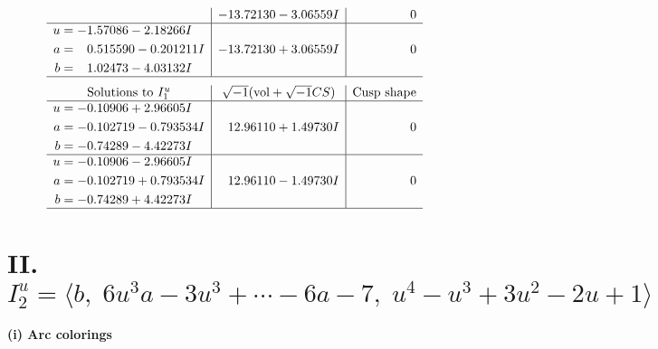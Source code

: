 \documentclass[1p]{elsarticle_modified}
\theoremstyle{definition}
\newcommand{\I}{\sqrt{-1}}
\begin{document}
$$\begin{array}{c|c|c}
 & -13.72130 - 3.06559 I & \phantom{-0.000000 } 0 \\ \hline\begin{aligned}
u &= -1.57086 - 2.18266 I \\
a &= \phantom{-}0.515590 - 0.201211 I \\
b &= \phantom{-}1.02473 - 4.03132 I\end{aligned}
 & -13.72130 + 3.06559 I & \phantom{-0.000000 } 0\\
 \hline 
 \end{array}$$\newpage$$\begin{array}{c|c|c}  
\text{Solutions to }I^u_{1}& \I (\text{vol} + \sqrt{-1}CS) & \text{Cusp shape}\\
 \hline 
\begin{aligned}
u &= -0.10906 + 2.96605 I \\
a &= -0.102719 - 0.793534 I \\
b &= -0.74289 - 4.42273 I\end{aligned}
 & \phantom{-}12.96110 + 1.49730 I & \phantom{-0.000000 } 0 \\ \hline\begin{aligned}
u &= -0.10906 - 2.96605 I \\
a &= -0.102719 + 0.793534 I \\
b &= -0.74289 + 4.42273 I\end{aligned}
 & \phantom{-}12.96110 - 1.49730 I & \phantom{-0.000000 } 0\\
 \hline 
 \end{array}$$\newpage\newpage\renewcommand{\arraystretch}{1}
\centering \section*{II. $I^u_{2}= \langle b,\;6 u^3 a-3 u^3+\cdots-6 a-7,\;u^4- u^3+3 u^2-2 u+1 \rangle$}
\flushleft \textbf{(i) Arc colorings}\\
\end{document}
